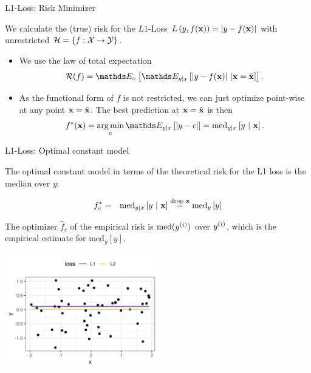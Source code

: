 \documentclass[11pt,compress,t,notes=noshow, xcolor=table]{beamer}
\begin{document}
\begin{vbframe}{L1-Loss: Risk Minimizer}

We calculate the (true) risk for the $L1$-Loss $L\left(y, f(\mathbf{x})\right) = \left|y-f(\mathbf{x})\right|$ with unrestricted $\mathcal{H} = \{f: \mathcal{X} \to \mathcal{Y}\}$. 

\vspace{0.5cm}

\begin{itemize}
  \setlength{\itemsep}{1.4em}  
  \item We use the law of total expectation
  \vspace{0.3cm}
  $$
    \riskf = \E_x \left[\E_{y|x}\left[|y-\fx|~|\xv = \xtil\right]\right]. 
  $$
  \item As the functional form of $f$ is not restricted, we can just optimize point-wise at any point $\mathbf{x} = \tilde{\mathbf{x}}$. The best prediction at $\mathbf{x} = \tilde{\mathbf{x}}$ is then 
  \vspace{0.3cm}  
  $$
    f^{\ast}(\xv) = \argmin_c \E_{y|x}\left[|y - c|\right]= \text{med}_{y|x} \left[y ~|~ \xv \right]. 
  $$

\end{itemize}

\end{vbframe}

\begin{vbframe}{L1-Loss: Optimal constant model}

The optimal constant model in terms of the theoretical risk for the L1 loss is the median over $y$:

\begin{eqnarray*}
  f_{c}^{\ast} &=& \text{med}_{y|x} \left[y ~|~ \mathbf{x} \right] \overset{\text{drop } \mathbf{x}}{=}  \text{med}_{y} \left[y \right]
  \end{eqnarray*} 

The optimizer $\hat{f}_c$ of the empirical risk is $\text{med}(y^{(i)})$ over $y^{(i)}$, which is the empirical estimate for $\text{med}_{y} \left[y \right]$. 

\vspace*{-0.3cm}

\begin{center}
\includegraphics[width = 0.5\textwidth ]{figure/l1_vs_l2.png} \\
\end{center}

\end{vbframe}


\endlecture
\end{document}
